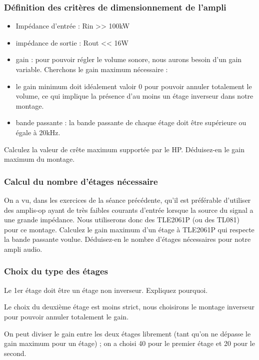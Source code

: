 \documentclass{../template/labo}
\begin{document}
\subsubsection{Définition des critères de dimensionnement de l'ampli}

\begin{itemize}
\item Impédance d'entrée : Rin >> 100kW
\item impédance de sortie : Rout << 16W
\item gain : pour pouvoir régler le volume sonore, nous aurons besoin d'un gain variable. Cherchons le gain maximum nécessaire :
\item le gain minimum doit idéalement valoir 0 pour pouvoir annuler totalement le volume, ce qui implique la présence d'au moins un étage inverseur dans notre montage.
\item bande passante : la bande passante de chaque étage doit être supérieure ou égale à 20kHz.
\end{itemize}

\Question
{
Calculez la valeur de crête maximum supportée par le HP.
}
{}
\Question
{
Déduisez-en le gain maximum du montage.
}
{}

\subsubsection{Calcul du nombre d'étages nécessaire}
On a vu, dans les exercices de la séance précédente, qu'il est préférable d'utiliser des amplis-op ayant de très faibles courants d'entrée lorsque la source du signal a une grande impédance. Nous utiliserons donc des TLE2061P (ou des TL081) pour ce montage.
\Question
{
Calculez le gain maximum d'un étage à TLE2061P qui respecte la bande passante voulue.
}
{}
\Question
{
Déduisez-en le nombre d'étages nécessaires pour notre ampli audio.
}
{}


\subsubsection{Choix du type des étages}
\Question
{
Le 1er étage doit être un étage non inverseur. Expliquez pourquoi.
}
{}

Le choix du deuxième étage est moins strict, nous choisirons le montage inverseur pour pouvoir annuler totalement le gain.

On peut diviser le gain entre les deux étages librement (tant qu'on ne dépasse le gain maximum pour un étage) ; on a choisi 40 pour le premier étage et 20 pour le second.
\end{document}
